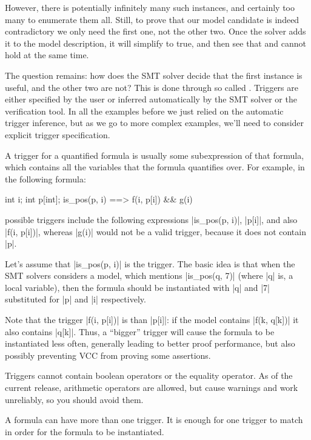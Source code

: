 However, there is potentially infinitely many such instances, and certainly too many
to enumerate them all.
Still, to prove that our model candidate is indeed contradictory
we only need the first one, not the other two.
Once the solver adds it to the model description,
it will simplify  to true,
and then see that  and  cannot hold
at the same time.

The question remains: how does the SMT solver decide that the first
instance is useful, and the other two are not?
This is done through so called .
Triggers are either specified by the user or inferred automatically
by the SMT solver or the verification tool.
In all the examples before we just relied on the automatic trigger
inference, but as we go to more complex examples, we'll need to consider
explicit trigger specification.

A trigger for a quantified formula is usually some subexpression 
of that formula, which contains all the variables that the formula
quantifies over.
For example, in the following formula:
\begin{VCC}
\forall int i; int p[int]; is_pos(p, i) ==> f(i, p[i]) && g(i)
\end{VCC}
possible triggers include the following expressions
\vcc|is_pos(p, i)|, \vcc|p[i]|, and also \vcc|f(i, p[i])|,
whereas \vcc|g(i)| would not be a valid trigger, because
it does not contain \vcc|p|.

Let's assume that \vcc|is_pos(p, i)| is the trigger. 
The basic idea is that when the SMT solvers considers a model,
which mentions \vcc|is_pos(q, 7)| (where \vcc|q| is, \eg a local variable), then the formula
should be instantiated with \vcc|q| and \vcc|7| substituted
for \vcc|p| and \vcc|i| respectively.

Note that the trigger \vcc|f(i, p[i])| is  than
\vcc|p[i]|: if the model contains \vcc|f(k, q[k])| it also contains \vcc|q[k]|.
Thus, a ``bigger'' trigger will cause the formula to be instantiated less often,
generally leading to better proof performance, but also possibly preventing
VCC from proving some assertions.

Triggers cannot contain boolean operators or the equality operator.
As of the current release, arithmetic operators are allowed, but cause warnings
and work unreliably, so you should avoid them.

A formula can have more than one trigger.
It is enough for one trigger to match in order for the formula
to be instantiated.

